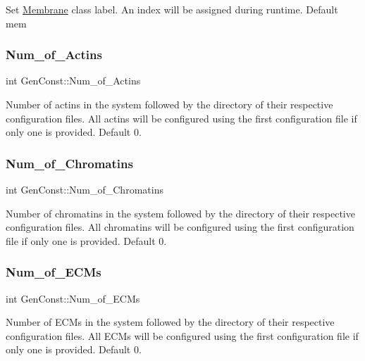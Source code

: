 Set \mbox{\hyperlink{classMembrane}{Membrane}} class label. An index will be assigned during runtime. Default mem \mbox{\label{namespaceGenConst_a74cb3c07acb344ebdeeb885fbdacd13a}} 
\subsubsection{\texorpdfstring{Num\_of\_Actins}{Num\_of\_Actins}}
{\footnotesize\ttfamily int Gen\+Const\+::\+Num\+\_\+of\+\_\+\+Actins}

Number of actins in the system followed by the directory of their respective configuration files. All actins will be configured using the first configuration file if only one is provided. Default 0. \mbox{\label{namespaceGenConst_a5834e6b32f10d9a8fdad757040eb51c0}} 
\subsubsection{\texorpdfstring{Num\_of\_Chromatins}{Num\_of\_Chromatins}}
{\footnotesize\ttfamily int Gen\+Const\+::\+Num\+\_\+of\+\_\+\+Chromatins}

Number of chromatins in the system followed by the directory of their respective configuration files. All chromatins will be configured using the first configuration file if only one is provided. Default 0. \mbox{\label{namespaceGenConst_a70039a764f7a8ef1084d977559fd5c3b}} 
\subsubsection{\texorpdfstring{Num\_of\_ECMs}{Num\_of\_ECMs}}
{\footnotesize\ttfamily int Gen\+Const\+::\+Num\+\_\+of\+\_\+\+E\+C\+Ms}

Number of E\+C\+Ms in the system followed by the directory of their respective configuration files. All E\+C\+Ms will be configured using the first configuration file if only one is provided. Default 0. \mbox{\label{namespaceGenConst_aa4620ff0cfd797dc4c4a3e49a110978f}} 
